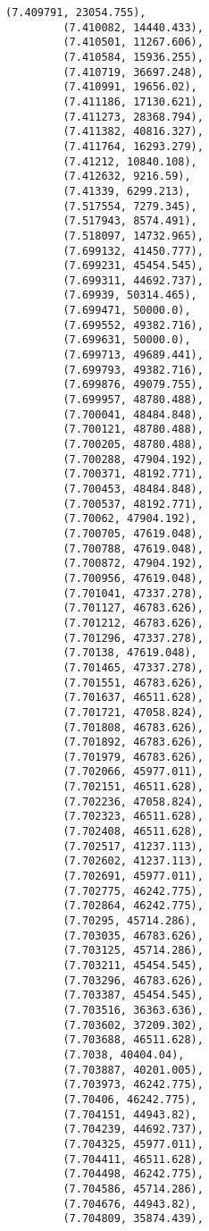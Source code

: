 \documentclass[11pt]{article}
\begin{document}
\begin{Verbatim}[commandchars=\\\{\}]
         (7.409791, 23054.755),
         (7.410082, 14440.433),
         (7.410501, 11267.606),
         (7.410584, 15936.255),
         (7.410719, 36697.248),
         (7.410991, 19656.02),
         (7.411186, 17130.621),
         (7.411273, 28368.794),
         (7.411382, 40816.327),
         (7.411764, 16293.279),
         (7.41212, 10840.108),
         (7.412632, 9216.59),
         (7.41339, 6299.213),
         (7.517554, 7279.345),
         (7.517943, 8574.491),
         (7.518097, 14732.965),
         (7.699132, 41450.777),
         (7.699231, 45454.545),
         (7.699311, 44692.737),
         (7.69939, 50314.465),
         (7.699471, 50000.0),
         (7.699552, 49382.716),
         (7.699631, 50000.0),
         (7.699713, 49689.441),
         (7.699793, 49382.716),
         (7.699876, 49079.755),
         (7.699957, 48780.488),
         (7.700041, 48484.848),
         (7.700121, 48780.488),
         (7.700205, 48780.488),
         (7.700288, 47904.192),
         (7.700371, 48192.771),
         (7.700453, 48484.848),
         (7.700537, 48192.771),
         (7.70062, 47904.192),
         (7.700705, 47619.048),
         (7.700788, 47619.048),
         (7.700872, 47904.192),
         (7.700956, 47619.048),
         (7.701041, 47337.278),
         (7.701127, 46783.626),
         (7.701212, 46783.626),
         (7.701296, 47337.278),
         (7.70138, 47619.048),
         (7.701465, 47337.278),
         (7.701551, 46783.626),
         (7.701637, 46511.628),
         (7.701721, 47058.824),
         (7.701808, 46783.626),
         (7.701892, 46783.626),
         (7.701979, 46783.626),
         (7.702066, 45977.011),
         (7.702151, 46511.628),
         (7.702236, 47058.824),
         (7.702323, 46511.628),
         (7.702408, 46511.628),
         (7.702517, 41237.113),
         (7.702602, 41237.113),
         (7.702691, 45977.011),
         (7.702775, 46242.775),
         (7.702864, 46242.775),
         (7.70295, 45714.286),
         (7.703035, 46783.626),
         (7.703125, 45714.286),
         (7.703211, 45454.545),
         (7.703296, 46783.626),
         (7.703387, 45454.545),
         (7.703516, 36363.636),
         (7.703602, 37209.302),
         (7.703688, 46511.628),
         (7.7038, 40404.04),
         (7.703887, 40201.005),
         (7.703973, 46242.775),
         (7.70406, 46242.775),
         (7.704151, 44943.82),
         (7.704239, 44692.737),
         (7.704325, 45977.011),
         (7.704411, 46511.628),
         (7.704498, 46242.775),
         (7.704586, 45714.286),
         (7.704676, 44943.82),
         (7.704809, 35874.439),

\end{Verbatim}
\end{document}
